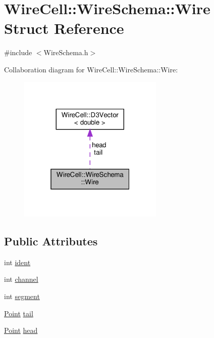 \hypertarget{struct_wire_cell_1_1_wire_schema_1_1_wire}{}\section{Wire\+Cell\+:\+:Wire\+Schema\+:\+:Wire Struct Reference}
\label{struct_wire_cell_1_1_wire_schema_1_1_wire}


{\ttfamily \#include $<$Wire\+Schema.\+h$>$}



Collaboration diagram for Wire\+Cell\+:\+:Wire\+Schema\+:\+:Wire\+:
\nopagebreak
\begin{figure}[H]
\begin{center}
\leavevmode
\includegraphics[width=196pt]{struct_wire_cell_1_1_wire_schema_1_1_wire__coll__graph}
\end{center}
\end{figure}
\subsection*{Public Attributes}
\begin{DoxyCompactItemize}
\item 
int \hyperlink{struct_wire_cell_1_1_wire_schema_1_1_wire_ae829271f99f04ba6932ce9757a6d243d}{ident}
\item 
int \hyperlink{struct_wire_cell_1_1_wire_schema_1_1_wire_abbfe64b103582b55c72c5ee83b4bb95b}{channel}
\item 
int \hyperlink{struct_wire_cell_1_1_wire_schema_1_1_wire_a448c811397ce24a74bb461283b3eaac9}{segment}
\item 
\hyperlink{namespace_wire_cell_ab2b2565fa6432efbb4513c14c988cda9}{Point} \hyperlink{struct_wire_cell_1_1_wire_schema_1_1_wire_a0189b8667a1dc1e045f221d062cf5027}{tail}
\item 
\hyperlink{namespace_wire_cell_ab2b2565fa6432efbb4513c14c988cda9}{Point} \hyperlink{struct_wire_cell_1_1_wire_schema_1_1_wire_a3deb60b43f43a80f83ac7352ea948497}{head}
\end{DoxyCompactItemize}



